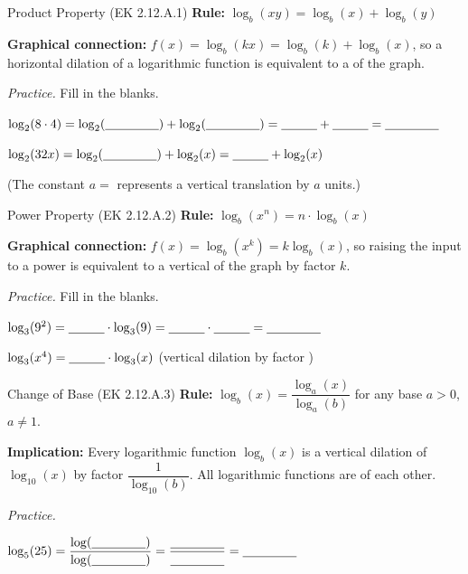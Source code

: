 \documentclass[10pt]{article}
\begin{document}
\begin{notesbox}{Product Property (EK 2.12.A.1)}
\textbf{Rule:} $\log_b(xy) = \log_b(x) + \log_b(y)$

\vspace{6pt}
\textbf{Graphical connection:} $f(x) = \log_b(kx) = \log_b(k) + \log_b(x)$, so a horizontal
dilation of a logarithmic function is equivalent to a \blank{4cm} of the graph.

\vspace{8pt}
\textit{Practice.} Fill in the blanks.

\vspace{4pt}
$\log_2(8 \cdot 4) = \log_2(\blank{1.5cm}) + \log_2(\blank{1.5cm}) = \blank{1cm} + \blank{1cm} = \blank{1.5cm}$

\vspace{6pt}
$\log_2(32x) = \log_2(\blank{1.5cm}) + \log_2(x) = \blank{1cm} + \log_2(x)$

\vspace{4pt}
(The constant $a = $ \blank{1cm} represents a vertical translation \blank{2cm} by $a$ units.)
\end{notesbox}

\vspace{0.08in}

\begin{notesbox}{Power Property (EK 2.12.A.2)}
\textbf{Rule:} $\log_b(x^n) = n \cdot \log_b(x)$

\vspace{6pt}
\textbf{Graphical connection:} $f(x) = \log_b(x^k) = k\log_b(x)$, so raising the input to a
power is equivalent to a vertical \blank{3.5cm} of the graph by factor $k$.

\vspace{8pt}
\textit{Practice.} Fill in the blanks.

\vspace{4pt}
$\log_3(9^2) = \blank{1cm} \cdot \log_3(9) = \blank{1cm} \cdot \blank{1cm} = \blank{1.5cm}$

\vspace{6pt}
$\log_3(x^4) = \blank{1cm} \cdot \log_3(x)$ \qquad (vertical dilation by factor \blank{1cm})
\end{notesbox}

\vspace{0.08in}

\begin{notesbox}{Change of Base (EK 2.12.A.3)}
\textbf{Rule:} $\log_b(x) = \dfrac{\log_a(x)}{\log_a(b)}$ for any base $a > 0$, $a \ne 1$.

\vspace{6pt}
\textbf{Implication:} Every logarithmic function $\log_b(x)$ is a vertical dilation of $\log_{10}(x)$
by factor $\dfrac{1}{\log_{10}(b)}$. All logarithmic functions are \blank{5cm} of each other.

\vspace{8pt}
\textit{Practice.}

\vspace{4pt}
$\log_5(25) = \dfrac{\log(\blank{1.5cm})}{\log(\blank{1.5cm})} = \dfrac{\blank{1.5cm}}{\blank{1.5cm}} = \blank{1.5cm}$
\end{notesbox}
\end{document}
